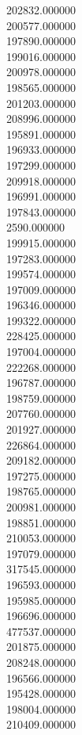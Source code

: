 202832.000000\\
200577.000000\\
197890.000000\\
199016.000000\\
200978.000000\\
198565.000000\\
201203.000000\\
208996.000000\\
195891.000000\\
196933.000000\\
197299.000000\\
209918.000000\\
196991.000000\\
197843.000000\\
2590.000000\\
199915.000000\\
197283.000000\\
199574.000000\\
197009.000000\\
196346.000000\\
199322.000000\\
228425.000000\\
197004.000000\\
222268.000000\\
196787.000000\\
198759.000000\\
207760.000000\\
201927.000000\\
226864.000000\\
209182.000000\\
197275.000000\\
198765.000000\\
200981.000000\\
198851.000000\\
210053.000000\\
197079.000000\\
317545.000000\\
196593.000000\\
195985.000000\\
196696.000000\\
477537.000000\\
201875.000000\\
208248.000000\\
196566.000000\\
195428.000000\\
198004.000000\\
210409.000000\\
